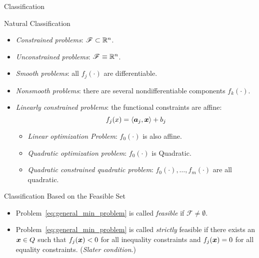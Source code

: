 \begin{boxnote}{Classification}

\begin{note}{Natural Classification}
    \begin{itemize}
        \item \emph{Constrained problems}: \(\mathscr{F} \subset \mathbb{R}^n\).
        \item \emph{Unconstrained problems}: \(\mathscr{F} \equiv \mathbb{R}^n\).
        \item \emph{Smooth problems}: all \(f_j(\cdot)\) are differentiable.
        \item \emph{Nonsmooth problems}: there are several nondifferentiable components \(f_k(\cdot)\).
        \item \emph{Linearly constrained problems}: the functional constraints are affine:
            \[
                    f_j(x) = \langle \boldsymbol{a}_j, \boldsymbol{x} \rangle + b_j
            \]
            \begin{itemize}
                \item \emph{Linear optimization Problem}: \(f_0(\cdot)\) is also affine.
                \item \emph{Quadratic optimization problem}: \(f_0(\cdot)\) is Quadratic.
                \item \emph{Quadratic constrained quadratic problem}: \(f_0(\cdot), \dots, f_m(\cdot)\) are all quadratic.
            \end{itemize}
    \end{itemize}
\end{note}

\begin{note}{Classification Based on the Feasible Set}
    \begin{itemize}
        \item Problem~\ref{eq:general_min_problem} is called \emph{feasible} if \(\mathscr{F} \ne \emptyset\).
        \item Problem~\ref{eq:general_min_problem} is called \emph{strictly} feasible if there exists an \(\boldsymbol{x} \in Q\) such that \(f_j(\boldsymbol{x}) < 0\) for all inequality constraints and \(f_j(\boldsymbol{x}) = 0\) for all equality constraints. (\textit{Slater condition}.)
    \end{itemize}
\end{note}


\end{boxnote}
